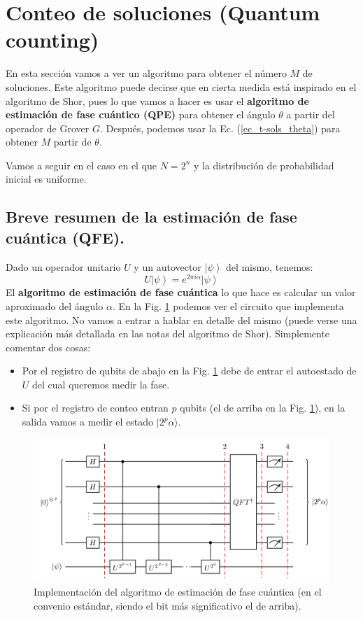 \documentclass[a4paper,11pt]{article} %
\numberwithin{equation}{section}
\begin{document}
\newpage
\section{Conteo de soluciones (Quantum counting)} \label{sec_quantum_counting}


En esta sección vamos a ver un algoritmo para obtener el número $M$ de soluciones. Este algoritmo puede decirse que en cierta medida está inspirado en el algoritmo de Shor, pues lo que vamos a hacer es usar el \textbf{algoritmo de estimación de fase cuántico (QPE)} para obtener el ángulo $\theta$ a partir del operador de Grover $G$. Después, podemos usar la Ec. (\ref{ec_t-sols_theta}) para obtener $M$ partir de $\theta$.

Vamos a seguir en el caso en el que $N=2^n$ y la distribución de probabilidad inicial es uniforme.

\subsection{Breve resumen de la estimación de fase cuántica (QFE).}

Dado un operador unitario $U$ y un autovector $\left| \psi \right\rangle$ del mismo, tenemos:
$$
U \left| \psi \right\rangle = e^{2 \pi i \alpha}  \left| \psi \right\rangle
$$
El \textbf{algoritmo de estimación de fase cuántica} lo que hace es calcular un valor aproximado del ángulo $\alpha$.
En la Fig. \ref{Fig_QC_QPE} podemos ver el circuito que implementa este algoritmo. No vamos a entrar a hablar en detalle del mismo (puede verse una explicación más detallada en las notas del algoritmo de Shor). Simplemente comentar dos cosas:
\begin{itemize}
	\item Por el registro de qubits de abajo en la Fig. \ref{Fig_QC_QPE} debe de entrar el autoestado de $U$ del cual queremos medir la fase.
	
	\item Si por el registro de conteo entran $p$ qubits (el de arriba en la Fig. \ref{Fig_QC_QPE}), en la salida vamos a medir el estado $| 2^p \alpha \rangle$.
\end{itemize}

	\begin{figure}[h] 
	\centering 
	\includegraphics[width=0.8\linewidth]{Figuras/Fig_QC_QPE.png}
	\caption{Implementación del algoritmo de estimación de fase cuántica 
	(en el convenio estándar, siendo el bit más significativo el de arriba).}
	\label{Fig_QC_QPE}
	\end{figure}
\end{document}
